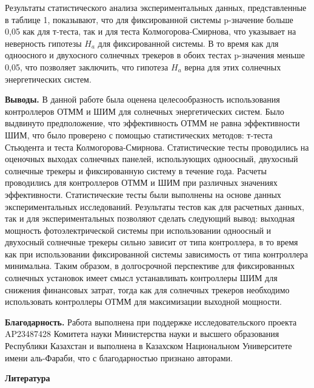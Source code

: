 \begin{multicols}{2}
Результаты статистического анализа экспериментальных данных,
представленные в таблице 1, показывают, что для фиксированной системы
p-значение больше 0,05 как для т-теста, так и для теста
Колмогорова-Смирнова, что указывает на неверность гипотезы \(H_{a}\) для
фиксированной системы. В то время как для одноосного и двухосного
солнечных трекеров в обоих тестах p-значения меньше 0,05, что позволяет
заключить, что гипотеза \(H_{a}\) верна для этих солнечных
энергетических систем.

{\bfseries Выводы.} В данной работе была оценена целесообразность
использования контроллеров ОТММ и ШИМ для солнечных энергетических
систем. Было выдвинуто предположение, что эффективность ОТММ не равна
эффективности ШИМ, что было проверено с помощью статистических методов:
т-теста Стьюдента и теста Колмогорова-Смирнова. Статистические тесты
проводились на оценочных выходах солнечных панелей, использующих
одноосный, двухосный солнечные трекеры и фиксированную систему в течение
года. Расчеты проводились для контроллеров ОТММ и ШИМ при различных
значениях эффективности. Статистические тесты были выполнены на основе
данных экспериментальных исследований. Результаты тестов как для
расчетных данных, так и для экспериментальных позволяют сделать
следующий вывод: выходная мощность фотоэлектрической системы при
использовании одноосный и двухосный солнечные трекеры сильно зависит от
типа контроллера, в то время как при использовании фиксированной системы
зависимость от типа контроллера минимальна. Таким образом, в
долгосрочной перспективе для фиксированных солнечных установок имеет
смысл устанавливать контроллеры ШИМ для снижения финансовых затрат,
тогда как для солнечных трекеров необходимо использовать контроллеры
ОТММ для максимизации выходной мощности.

{\bfseries Благодарность.} Работа выполнена при поддержке
исследовательского проекта AP23487428 Комитета науки Министерства науки
и высшего образования Республики Казахстан и выполнена в Казахском
Национальном Университете имени аль-Фараби, что с благодарностью
признано авторами.
\end{multicols}

\begin{center}
{\bfseries Литература}
\end{center}

